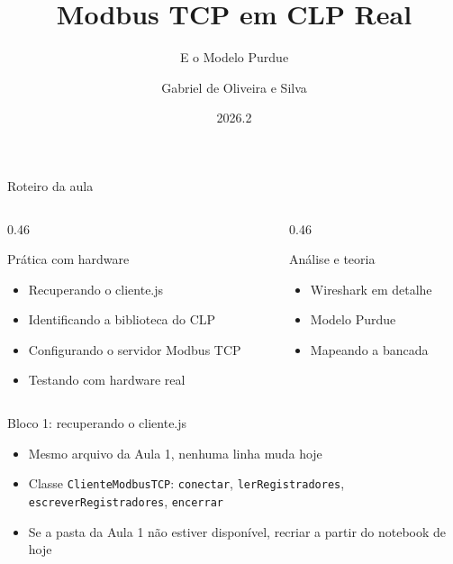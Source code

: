 \documentclass[12pt, aspectratio=169]{beamer}
\title[Aula 2]{Modbus TCP em CLP Real}
\subtitle{E o Modelo Purdue}
\author{Gabriel de Oliveira e Silva}
\institute{Monitoria de Introdução às Redes de Comunicação, UFPE}
\date{2026.2}
\begin{document}
\begin{frame}
  \titlepage
\end{frame}

\begin{frame}{Roteiro da aula}
  \vspace{0.45cm}
  \begin{columns}[T, totalwidth=\textwidth]
    \begin{column}{0.46\textwidth}
      \begin{block}{Prática com hardware}
        \begin{itemize}
          \item Recuperando o cliente.js
          \item Identificando a biblioteca do CLP
          \item Configurando o servidor Modbus TCP
          \item Testando com hardware real
        \end{itemize}
      \end{block}
    \end{column}
    \begin{column}{0.46\textwidth}
      \begin{block}{Análise e teoria}
        \begin{itemize}
          \item Wireshark em detalhe
          \item Modelo Purdue
          \item Mapeando a bancada
        \end{itemize}
      \end{block}
    \end{column}
  \end{columns}
\end{frame}

\begin{frame}{Bloco 1: recuperando o cliente.js}
  \vspace{0.4cm}
  \begin{itemize}
    \item Mesmo arquivo da Aula 1, nenhuma linha muda hoje
    \item Classe \texttt{ClienteModbusTCP}: \texttt{conectar}, \texttt{lerRegistradores}, \texttt{escreverRegistradores}, \texttt{encerrar}
    \item Se a pasta da Aula 1 não estiver disponível, recriar a partir do notebook de hoje
  \end{itemize}
\end{frame}
\end{document}
